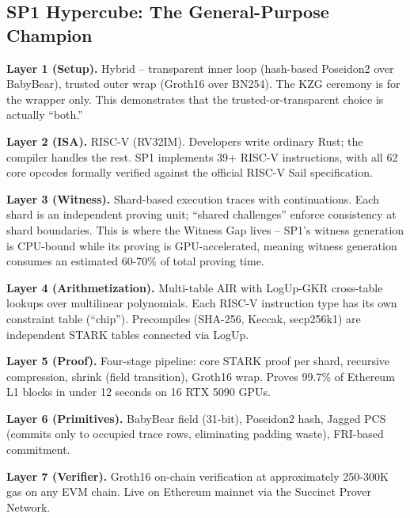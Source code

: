 \documentclass[
  11pt,
  openany]{report}
\renewcommand{\textbf}[1]{{\bfseries\color{MidnightBold}#1}}
\begin{document}
\subsection{SP1 Hypercube: The General-Purpose
Champion}\label{sp1-hypercube-the-general-purpose-champion}

\textbf{Layer 1 (Setup).} Hybrid -- transparent inner loop (hash-based Poseidon2
over BabyBear), trusted outer wrap (Groth16 over BN254). The KZG ceremony is for
the wrapper only. This demonstrates that the trusted-or-transparent choice is
actually ``both.''

\textbf{Layer 2 (ISA).} RISC-V (RV32IM). Developers write ordinary Rust; the
compiler handles the rest. SP1 implements 39+ RISC-V instructions, with all 62
core opcodes formally verified against the official RISC-V Sail specification.

\textbf{Layer 3 (Witness).} Shard-based execution traces with continuations.
Each shard is an independent proving unit; ``shared challenges'' enforce
consistency at shard boundaries. This is where the Witness Gap lives -- SP1's
witness generation is CPU-bound while its proving is GPU-accelerated, meaning
witness generation consumes an estimated 60-70\% of total proving time.

\textbf{Layer 4 (Arithmetization).} Multi-table AIR with LogUp-GKR cross-table
lookups over multilinear polynomials. Each RISC-V instruction type has its own
constraint table (``chip''). Precompiles (SHA-256, Keccak, secp256k1) are
independent STARK tables connected via LogUp.

\textbf{Layer 5 (Proof).} Four-stage pipeline: core STARK proof per shard,
recursive compression, shrink (field transition), Groth16 wrap. Proves 99.7\% of
Ethereum L1 blocks in under 12 seconds on 16 RTX 5090 GPUs.

\textbf{Layer 6 (Primitives).} BabyBear field (31-bit), Poseidon2 hash, Jagged
PCS (commits only to occupied trace rows, eliminating padding waste), FRI-based
commitment.

\textbf{Layer 7 (Verifier).} Groth16 on-chain verification at approximately
250-300K gas on any EVM chain. Live on Ethereum mainnet via the Succinct Prover
Network.
\end{document}
